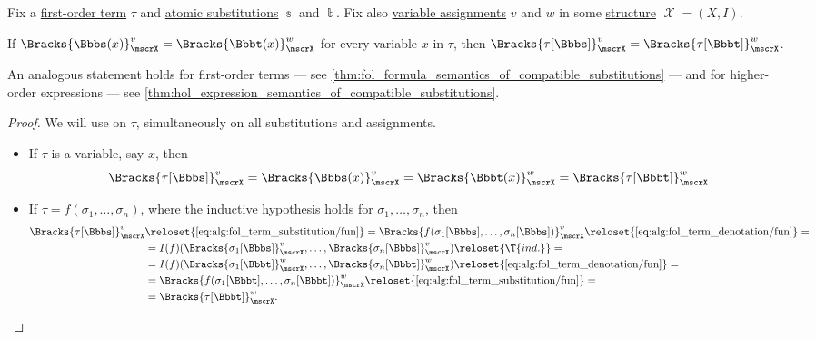 \begin{proposition}\label{thm:fol_term_semantics_of_compatible_substitutions}
  Fix a \hyperref[def:fol_term]{first-order term} \( \tau \) and \hyperref[def:atomic_fol_substitution]{atomic substitutions} \( \Bbbs \) and \( \Bbbt \). Fix also \hyperref[def:fol_variable_assignment]{variable assignments} \( v \) and \( w \) in some \hyperref[def:fol_structure]{structure} \( \mscrX = (X, I) \).

  If \( \Bracks{\Bbbs(x)}_\mscrX^v = \Bracks{\Bbbt(x)}_\mscrX^w \) for every variable \( x \) in \( \tau \), then \( \Bracks{\tau[\Bbbs]}_\mscrX^v = \Bracks{\tau[\Bbbt]}_\mscrX^w \).
\end{proposition}
\begin{comments}
  \item An analogous statement holds for first-order terms --- see \cref{thm:fol_formula_semantics_of_compatible_substitutions} --- and for higher-order expressions --- see \cref{thm:hol_expression_semantics_of_compatible_substitutions}.
\end{comments}
\begin{proof}
  We will use  on \( \tau \), simultaneously on all substitutions and assignments.
  \begin{itemize}
    \item If \( \tau \) is a variable, say \( x \), then
    \begin{equation*}
      \Bracks{\tau[\Bbbs]}_\mscrX^v
      =
      \Bracks{\Bbbs(x)}_\mscrX^v
      =
      \Bracks{\Bbbt(x)}_\mscrX^w
      =
      \Bracks{\tau[\Bbbt]}_\mscrX^w
    \end{equation*}

    \item If \( \tau = f(\sigma_1, \ldots, \sigma_n) \), where the inductive hypothesis holds for \( \sigma_1, \ldots, \sigma_n \), then
    \begin{align*}
      \Bracks{\tau[\Bbbs]}_\mscrX^v
      &\reloset {\eqref{eq:alg:fol_term_substitution/fun}} =
      \Bracks{f(\sigma_1[\Bbbs], \ldots, \sigma_n[\Bbbs])}_\mscrX^v
      \reloset {\eqref{eq:alg:fol_term_denotation/fun}} = \\ &=
      I(f)(\Bracks{\sigma_1[\Bbbs]}_\mscrX^v, \ldots, \Bracks{\sigma_n[\Bbbs]}_\mscrX^v)
      \reloset {\T{ind.}} = \\ &=
      I(f)(\Bracks{\sigma_1[\Bbbt]}_\mscrX^w, \ldots, \Bracks{\sigma_n[\Bbbt]}_\mscrX^w)
      \reloset {\eqref{eq:alg:fol_term_denotation/fun}} = \\ &=
      \Bracks{f(\sigma_1[\Bbbt], \ldots, \sigma_n[\Bbbt])}_\mscrX^w
      \reloset {\eqref{eq:alg:fol_term_substitution/fun}} = \\ &=
      \Bracks{\tau[\Bbbt]}_\mscrX^w.
    \end{align*}
  \end{itemize}
\end{proof}

